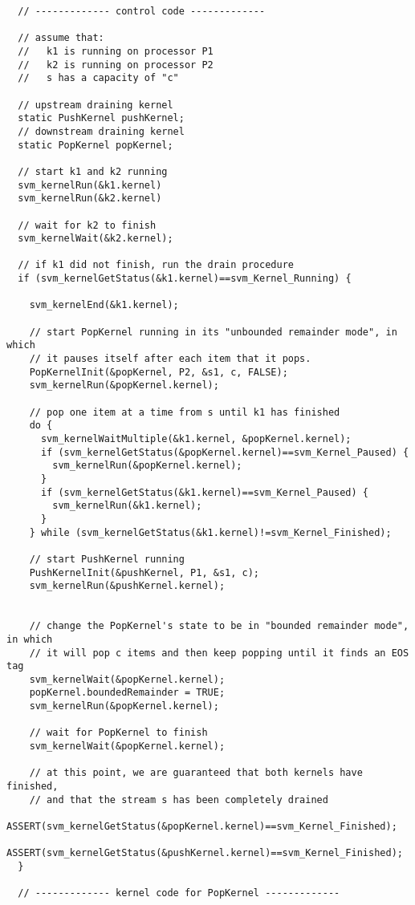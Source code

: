 {\small
\begin{verbatim}
  // ------------- control code -------------

  // assume that:
  //   k1 is running on processor P1
  //   k2 is running on processor P2
  //   s has a capacity of "c"

  // upstream draining kernel
  static PushKernel pushKernel;
  // downstream draining kernel
  static PopKernel popKernel;

  // start k1 and k2 running
  svm_kernelRun(&k1.kernel)
  svm_kernelRun(&k2.kernel)

  // wait for k2 to finish
  svm_kernelWait(&k2.kernel);

  // if k1 did not finish, run the drain procedure
  if (svm_kernelGetStatus(&k1.kernel)==svm_Kernel_Running) {

    svm_kernelEnd(&k1.kernel);

    // start PopKernel running in its "unbounded remainder mode", in which
    // it pauses itself after each item that it pops.
    PopKernelInit(&popKernel, P2, &s1, c, FALSE);
    svm_kernelRun(&popKernel.kernel);

    // pop one item at a time from s until k1 has finished
    do {
      svm_kernelWaitMultiple(&k1.kernel, &popKernel.kernel);
      if (svm_kernelGetStatus(&popKernel.kernel)==svm_Kernel_Paused) {
        svm_kernelRun(&popKernel.kernel);
      }
      if (svm_kernelGetStatus(&k1.kernel)==svm_Kernel_Paused) {
        svm_kernelRun(&k1.kernel);
      }
    } while (svm_kernelGetStatus(&k1.kernel)!=svm_Kernel_Finished);
    
    // start PushKernel running
    PushKernelInit(&pushKernel, P1, &s1, c);
    svm_kernelRun(&pushKernel.kernel);


    // change the PopKernel's state to be in "bounded remainder mode", in which
    // it will pop c items and then keep popping until it finds an EOS tag
    svm_kernelWait(&popKernel.kernel);
    popKernel.boundedRemainder = TRUE;
    svm_kernelRun(&popKernel.kernel);

    // wait for PopKernel to finish
    svm_kernelWait(&popKernel.kernel);

    // at this point, we are guaranteed that both kernels have finished, 
    // and that the stream s has been completely drained
    ASSERT(svm_kernelGetStatus(&popKernel.kernel)==svm_Kernel_Finished);
    ASSERT(svm_kernelGetStatus(&pushKernel.kernel)==svm_Kernel_Finished);
  }

  // ------------- kernel code for PopKernel -------------


\end{verbatim}}
